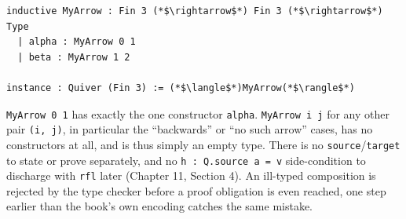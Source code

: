 \begin{lstlisting}
inductive MyArrow : Fin 3 (*$\rightarrow$*) Fin 3 (*$\rightarrow$*) Type
  | alpha : MyArrow 0 1
  | beta : MyArrow 1 2

instance : Quiver (Fin 3) := (*$\langle$*)MyArrow(*$\rangle$*)
\end{lstlisting}

\texttt{MyArrow 0 1} has exactly the one constructor \texttt{alpha}. \texttt{MyArrow i j} for any other pair \texttt{(i, j)}, in particular the ``backwards'' or ``no such arrow'' cases, has no constructors at all, and is thus simply an empty type. There is no \texttt{source}/\texttt{target} to state or prove separately, and no \texttt{h : Q.source a = v} side-condition to discharge with \texttt{rfl} later (Chapter 11, Section 4). An ill-typed composition is rejected by the type checker before a proof obligation is even reached, one step earlier than the book's own encoding catches the same mistake.
